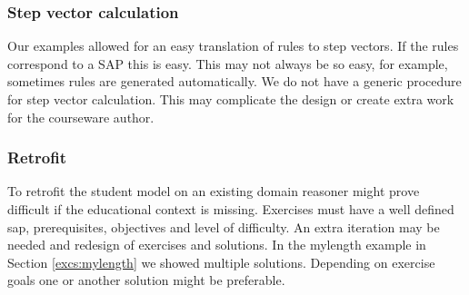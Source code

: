 \subsubsection{Step vector calculation}
Our examples allowed for an easy translation of rules to step vectors.
If the rules correspond to a SAP this is easy.
This may not always be so easy, for example,  sometimes rules are generated automatically.
We do not have a generic procedure for step vector calculation.
This may complicate the design or create extra work for the courseware author.

\subsubsection{Retrofit}
To retrofit the student model on an existing domain reasoner might prove difficult if the educational context is missing.
Exercises must have a well defined \gls{sap}, prerequisites, objectives and level of difficulty.
An extra iteration may be needed and redesign of exercises and solutions.
In the mylength example in Section \ref{excs:mylength} we showed multiple solutions.
Depending on exercise goals one or another solution might be preferable.








